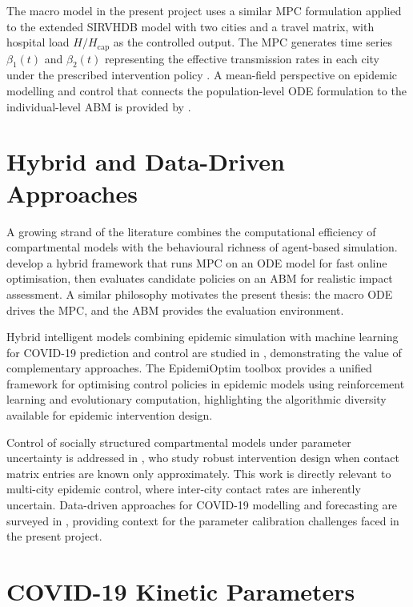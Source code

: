 The macro model in the present project uses a similar MPC formulation applied to the extended SIRVHDB model with two cities and a travel matrix, with hospital load $H/H_{\mathrm{cap}}$ as the controlled output.
The MPC generates time series $\beta_1(t)$ and $\beta_2(t)$ representing the effective transmission rates in each city under the prescribed intervention policy \citep{mathworks2025}.
A mean-field perspective on epidemic modelling and control that connects the population-level ODE formulation to the individual-level ABM is provided by \citet{roy2023}.

\section{Hybrid and Data-Driven Approaches}
\label{sec:hybrid}

A growing strand of the literature combines the computational efficiency of compartmental models with the behavioural richness of agent-based simulation.
\citet{polcz2025} develop a hybrid framework that runs MPC on an ODE model for fast online optimisation, then evaluates candidate policies on an ABM for realistic impact assessment.
A similar philosophy motivates the present thesis: the macro ODE drives the MPC, and the ABM provides the evaluation environment.

Hybrid intelligent models combining epidemic simulation with machine learning for COVID-19 prediction and control are studied in \citet{plank2021}, demonstrating the value of complementary approaches.
The EpidemiOptim toolbox \citep{colas2021} provides a unified framework for optimising control policies in epidemic models using reinforcement learning and evolutionary computation, highlighting the algorithmic diversity available for epidemic intervention design.

Control of socially structured compartmental models under parameter uncertainty is addressed in \citet{albi2021}, who study robust intervention design when contact matrix entries are known only approximately.
This work is directly relevant to multi-city epidemic control, where inter-city contact rates are inherently uncertain.
Data-driven approaches for COVID-19 modelling and forecasting are surveyed in \citet{ramazi2021}, providing context for the parameter calibration challenges faced in the present project.

\section{COVID-19 Kinetic Parameters}
\label{sec:params}

